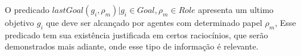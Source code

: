 O predicado $lastGoal(g_i,\rho_m) | g_i \in Goal, \rho_m \in Role $ apresenta um ultimo objetivo $g_i$ que deve ser alcançado 
por agentes com determinado papel $\rho_m$, Esse predicado tem sua existência justificada em certos raciocínios, que serão demonstrados 
mais adiante, onde esse tipo de informação é relevante.